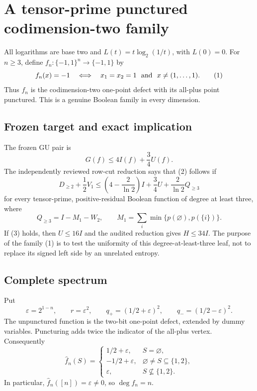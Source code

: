 \section*{A tensor-prime punctured codimension-two family}

All logarithms are base two and
\(L(t)=t\log_2(1/t)\), with \(L(0)=0\).  For \(n\ge3\), define
\(f_n:\{-1,1\}^n\to\{-1,1\}\) by
\[
 f_n(x)=-1
 \quad\Longleftrightarrow\quad
 x_1=x_2=1\ \hbox{ and }\ x\ne(1,\ldots,1).
 \tag{1}
\]
Thus \(f_n\) is the codimension-two one-point defect with its all-plus
point punctured.  This is a genuine Boolean family in every dimension.

\subsection*{Frozen target and exact implication}

The frozen GU pair is
\[
 G(f)\le4I(f)+\frac34U(f).                              \tag{2}
\]
The independently reviewed row-cut reduction says that (2) follows if
\[
 D_{\ge2}+\frac12V_1
 \le\left(4-\frac2{\ln2}\right)I+\frac34U
      +\frac2{\ln2}Q_{\ge3}                             \tag{3}
\]
for every tensor-prime, positive-residual Boolean function of degree at
least three, where
\[
 Q_{\ge3}=I-M_1-W_2,
 \qquad M_1=\sum_i\min\{p(\varnothing),p(\{i\})\}.
\]
If (3) holds, then \(U\le16I\) and the audited reduction gives
\(H\le34I\).  The purpose of the family (1) is to test the uniformity of
this degree-at-least-three leaf, not to replace its signed left side by an
unrelated entropy.

\subsection*{Complete spectrum}

Put
\[
 \varepsilon=2^{1-n},\qquad r=\varepsilon^2,
 \qquad q_+=(1/2+\varepsilon)^2,
 \qquad q_-=(1/2-\varepsilon)^2.
\]
The unpunctured function is the two-bit one-point defect, extended by dummy
variables.  Puncturing adds twice the indicator of the all-plus vertex.
Consequently
\[
 \widehat f_n(S)=
 \begin{cases}
  1/2+\varepsilon,&S=\varnothing,\\
  -1/2+\varepsilon,&\varnothing\ne S\subseteq\{1,2\},\\
  \varepsilon,&S\not\subseteq\{1,2\}.
 \end{cases}                                             \tag{4}
\]
In particular, \(\widehat f_n([n])=\varepsilon\ne0\), so
\(\deg f_n=n\).

